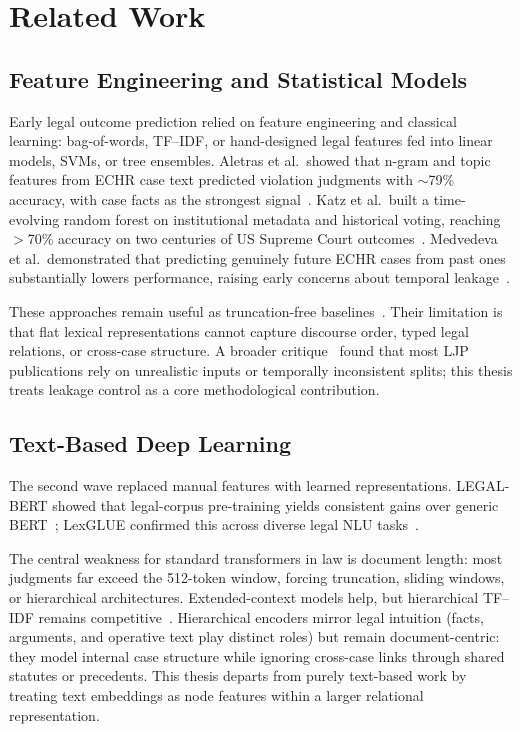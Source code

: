 \chapter{Related Work}

\section{Feature Engineering and Statistical Models}

Early legal outcome prediction relied on feature engineering and classical learning: bag-of-words, TF--IDF, or hand-designed legal features fed into linear models, SVMs, or tree ensembles. Aletras et al.\ showed that n-gram and topic features from ECHR case text predicted violation judgments with $\sim$79\% accuracy, with case facts as the strongest signal~\cite{aletras2016echr}. Katz et al.\ built a time-evolving random forest on institutional metadata and historical voting, reaching $>$70\% accuracy on two centuries of US Supreme Court outcomes~\cite{katz2017supreme}. Medvedeva et al.\ demonstrated that predicting genuinely future ECHR cases from past ones substantially lowers performance, raising early concerns about temporal leakage~\cite{medvedeva2020echr}.

These approaches remain useful as truncation-free baselines~\cite{mamakas2022longlegal}. Their limitation is that flat lexical representations cannot capture discourse order, typed legal relations, or cross-case structure. A broader critique~\cite{medvedeva2023doitright} found that most LJP publications rely on unrealistic inputs or temporally inconsistent splits; this thesis treats leakage control as a core methodological contribution.

\section{Text-Based Deep Learning}

The second wave replaced manual features with learned representations. LEGAL-BERT showed that legal-corpus pre-training yields consistent gains over generic BERT~\cite{chalkidis2020legalbert}; LexGLUE confirmed this across diverse legal NLU tasks~\cite{chalkidis2022lexglue}.

The central weakness for standard transformers in law is document length: most judgments far exceed the 512-token window, forcing truncation, sliding windows, or hierarchical architectures. Extended-context models help, but hierarchical TF--IDF remains competitive~\cite{mamakas2022longlegal}. Hierarchical encoders mirror legal intuition (facts, arguments, and operative text play distinct roles) but remain document-centric: they model internal case structure while ignoring cross-case links through shared statutes or precedents. This thesis departs from purely text-based work by treating text embeddings as node features within a larger relational representation.

